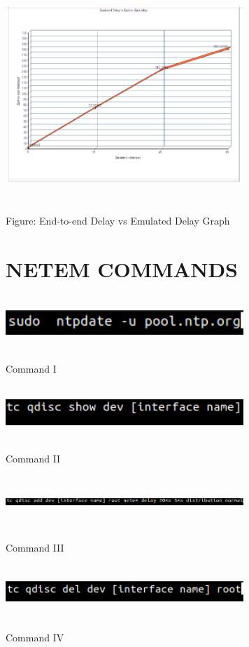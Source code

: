 \documentclass[letterpaper, 12 pt, conference]{ieeeconf}  %
\begin{document}
\includegraphics[width=9cm, height=8cm]{graph.png}

\begin{center}
Figure: End-to-end Delay vs Emulated Delay Graph
\end{center}

\section{NETEM COMMANDS}

\includegraphics[width=9cm, height=2cm]{1.png}

\begin{center}
Command I
\end{center}

\includegraphics[width=9cm, height=2cm]{2.png}

\begin{center}
Command II
\end{center}

\includegraphics[width=9cm, height=2cm]{3.png}

\begin{center}
Command III
\end{center}

\includegraphics[width=9cm, height=2cm]{son.png}

\begin{center}
Command IV
\end{center}
\end{document}
